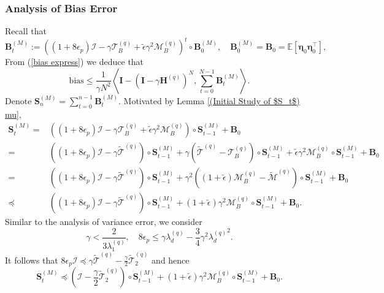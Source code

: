 \documentclass[11pt, letterpaper]{article}
\begin{document}
\subsubsection{Analysis of Bias Error}
Recall that
\begin{equation*}
    \mathbf{B}_t^{(M)}:=((1+8\epsilon_p)\mathcal{I}-\gamma\mathcal{T}_B^{(q)}+\tilde{\epsilon}\gamma^2\mathcal{M}_B^{(q)})^t \circ \mathbf{B}_0^{(M)}, \quad \mathbf{B}_0^{(M)}=\mathbf{B}_0=\mathbb{E}\left[\boldsymbol{\eta}_0 \boldsymbol{\eta}_0^\top\right],
\end{equation*}
From (\ref{bias express}) we deduce that
\begin{equation}
    \label{eq: bias m}
    \mathrm{bias}\leq \frac{1}{\gamma N^{2}}\left\langle\mathbf{I}-(\mathbf{I}-\gamma\mathbf{H}^{(q)})^{N},\sum_{t=0}^{N-1}\mathbf{B}_{t}^{(M)}\right\rangle.
\end{equation}
Denote $\mathbf{S}_n^{(M)}=\sum_{t=0}^{n-1}\mathbf{B}_t^{(M)}$. Motivated by Lemma \ref{(Initial Study of $S_t$) mu},
\begin{equation*}
    \begin{aligned}
        \mathbf{S}_{t}^{(M)} =& ((1+8\epsilon_p)\mathcal{I}-\gamma\mathcal{T}_B^{(q)}+\tilde{\epsilon}\gamma^2\mathcal{M}_B^{(q)})\circ\mathbf{S}_{t-1}^{(M)}+\mathbf{B}_0\\
        =& ((1+8\epsilon_p)\mathcal{I}-\gamma\widetilde{\mathcal{T}}^{(q)})\circ\mathbf{S}_{t-1}^{(M)}+\gamma (\widetilde{\mathcal{T}}^{(q)}-{\mathcal{T}}_B^{(q)})\circ\mathbf{S}_{t-1}^{(M)}+\tilde{\epsilon}\gamma^2\mathcal{M}_B^{(q)}\circ \mathbf{S}_{t-1}^{(M)}+\mathbf{B}_0\\
        =& ((1+8\epsilon_p)\mathcal{I}-\gamma\widetilde{\mathcal{T}}^{(q)})\circ\mathbf{S}_{t-1}^{(M)}+\gamma^2 ((1+\tilde{\epsilon}){\mathcal{M}}_B^{(q)}-\widetilde{\mathcal{M}}^{(q)})\circ\mathbf{S}_{t-1}^{(M)}+\mathbf{B}_0\\
        \preceq&((1+8\epsilon_p)\mathcal{I}-\gamma\tilde{\mathcal{T}}^{(q)})\circ\mathbf{S}_{t-1}^{(M)}+(1+\tilde{\epsilon})\gamma^{2}\mathcal{M}_B^{(q)}\circ\mathbf{S}_{t-1}^{(M)}+\mathbf{B}_{0}.
    \end{aligned}
\end{equation*}
Similar to the analysis of variance error, we consider
\begin{equation*}
    \gamma < \frac{2}{3\lambda_1^{(q)}},\quad 8\epsilon_p\leq \gamma \lambda_d^{(q)}-\frac{3}{4}\gamma^2{\lambda_d^{(q)}}^2.
\end{equation*}
It follows that $8\epsilon_p\mathcal{I}\preceq\gamma \widetilde{\mathcal{T}}^{(q)}-\frac{\gamma}{2}\widetilde{\mathcal{T}}_2^{(q)}$ and hence
\begin{equation}
    \label{eq: f20}
    \mathbf{S}_{t}^{(M)}\preceq(\mathcal{I}-\frac{\gamma}{2}\widetilde{\mathcal{T}}_2^{(q)})\circ\mathbf{S}_{t-1}^{(M)}+(1+\tilde{\epsilon})\gamma^{2}\mathcal{M}_B^{(q)}\circ\mathbf{S}_{t-1}^{(M)}+\mathbf{B}_{0}.
\end{equation}
\end{document}
